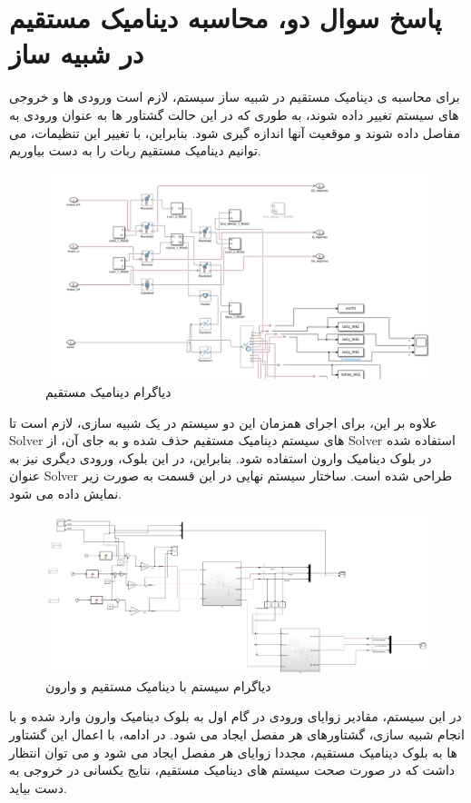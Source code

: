 \section*{ پاسخ سوال دو، محاسبه دینامیک مستقیم در شبیه ساز}
برای محاسبه ی دینامیک مستقیم در شبیه ساز سیستم، لازم است ورودی ها و خروجی های سیستم تغییر داده شوند، به طوری که در این حالت گشتاور ها به عنوان ورودی به مفاصل داده شوند و موقعیت آنها اندازه گیری شود. بنابراین، با تغییر این تنظیمات، می توانیم دینامیک مستقیم ربات را به دست بیاوریم. 
\begin{figure}[H]
	\centering
	\includegraphics[width=1\linewidth]{../img/9}
	\caption{دیاگرام دینامیک مستقیم}
	\label{fig:9}
\end{figure}
علاوه بر این، برای اجرای همزمان این دو سیستم در یک شبیه سازی، لازم است تا Solver های سیستم دینامیک مستقیم حذف شده و به جای آن، از Solver استفاده شده در بلوک دینامیک وارون استفاده شود. بنابراین، در این بلوک، ورودی دیگری نیز به عنوان Solver طراحی شده است.
ساختار سیستم نهایی در این قسمت به صورت زیر نمایش داده می شود. 
\begin{figure}[H]
	\centering
	\includegraphics[width=1\linewidth]{../img/10}
	\caption{دیاگرام سیستم با دینامیک مستقیم و وارون}
	\label{fig:10}
\end{figure}
در این سیستم، مقادیر زوایای ورودی در گام اول به بلوک دینامیک وارون وارد شده و با انجام شبیه سازی، گشتاورهای هر مفصل ایجاد می شود. در ادامه، با اعمال این گشتاور ها به بلوک دینامیک مستقیم، مجددا زوایای هر مفصل ایجاد می شود و می توان انتظار داشت که در صورت صحت سیستم های دینامیک مستقیم، نتایج یکسانی در خروجی به دست بیاید.
